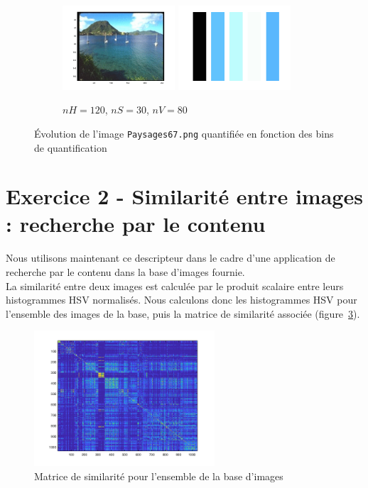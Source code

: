 \documentclass[a4paper]{article}
\newcommand{\figref}[1]{figure~\ref{#1}}
\begin{document}
\begin{figure}[H]
    \begin{subfigure}[c]{0.8\textwidth}
        \centering
        \includegraphics[width=0.46\textwidth]{images/Paysages67_quantifie_x10.png}
        \includegraphics[width=0.46\textwidth]{images/Paysages67_domi_x10.png}
        \caption{$nH = 120$, $nS = 30$, $nV = 80$}
        \label{subfig:Paysages67_x10}
    \end{subfigure}

    \caption{Évolution de l'image \texttt{Paysages67.png} quantifiée en fonction
    des bins de quantification} 
    \label{fig:ex1_var}
\end{figure}

\newpage
\section*{Exercice 2 - Similarité entre images : recherche par le contenu}

Nous utilisons maintenant ce descripteur dans le cadre d'une application de
recherche par le contenu dans la base d'images fournie. \\

La similarité entre deux images est calculée par le produit scalaire entre leurs
histogrammes HSV normalisés. Nous calculons donc les histogrammes HSV pour
l'ensemble des images de la base, puis la matrice de similarité associée
(\figref{fig:ex2_matriceSim}).

\begin{figure}[H]
    \center
    \includegraphics[width=0.6\textwidth]{images/matriceSim.png}
    \caption{Matrice de similarité pour l'ensemble de la base d'images}
    \label{fig:ex2_matriceSim}
\end{figure}
\end{document}
